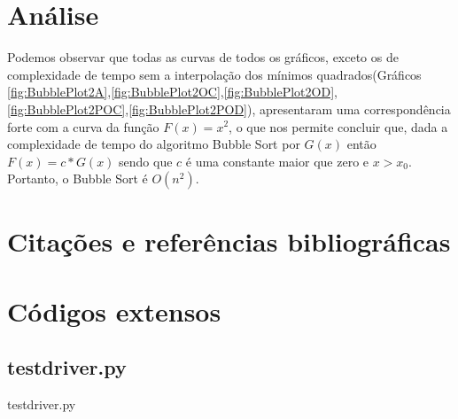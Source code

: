 \documentclass[12pt,a4paper,twoside]{report}
\begin{document}
\chapter{Análise}

Podemos observar que todas as curvas de todos os gráficos, exceto os de complexidade de tempo sem a interpolação dos mínimos quadrados(Gráficos \ref{fig:BubblePlot2A},\ref{fig:BubblePlot2OC},\ref{fig:BubblePlot2OD},\ref{fig:BubblePlot2POC},\ref{fig:BubblePlot2POD}), apresentaram uma correspondência forte com a curva da função $F(x) = x^2$, o que nos permite concluir que, dada a complexidade de tempo do algoritmo Bubble Sort por $G(x)$ então $F(x) = c * G(x)$ sendo que $c$ é uma constante maior que zero e $x > x_0$. Portanto, o Bubble Sort é $O(n^2)$.

\chapter{Citações e referências bibliográficas}








\clearpage
{}
\appendix

\chapter{Códigos extensos \label{ap:testdriver}}
\section{testdriver.py}
 {testdriver.py}
\end{document}
